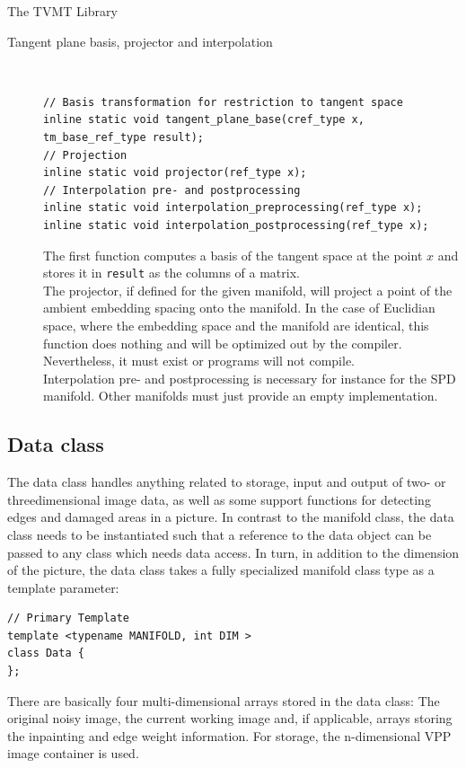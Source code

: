 \begin{chapter}{The TVMT Library}
\begin{description}
    \item[Tangent plane basis, projector and interpolation] \hfill \\
	\cppinline
	\begin{lstlisting}
// Basis transformation for restriction to tangent space
inline static void tangent_plane_base(cref_type x, tm_base_ref_type result);
// Projection
inline static void projector(ref_type x);
// Interpolation pre- and postprocessing
inline static void interpolation_preprocessing(ref_type x);
inline static void interpolation_postprocessing(ref_type x);
	\end{lstlisting}

	The first function computes a basis of the tangent space at the point $x$ and stores it in \texttt{result} as the columns of a matrix.\\
	The projector, if defined for the given manifold, will project a point of the ambient embedding spacing onto the manifold. In the case of Euclidian space, where the 
	embedding space and the manifold are identical, this function does nothing and will be optimized out by the compiler. Nevertheless, it must exist or programs will not compile.\\
	Interpolation pre- and postprocessing is necessary for instance for the SPD manifold. Other manifolds must just provide an empty implementation.
\end{description}
\subsection{Data class} %
\label{sub:Data class}
The data class handles anything related to storage, input and output of two- or threedimensional image data, as well as some support functions for detecting edges and damaged areas in a picture.
In contrast to the manifold class, the data class needs to be instantiated such that a reference to the data object can be passed to any class which needs data access. In turn, in addition
to the dimension of the picture, the data class takes a fully specialized manifold class type as a template parameter:

\cppinline
\begin{lstlisting}
// Primary Template
template <typename MANIFOLD, int DIM >
class Data {
};    
\end{lstlisting}

There are basically four multi-dimensional arrays stored in the data class: The original noisy image, the current working image and, if applicable, arrays storing the inpainting
and edge weight information. For storage, the n-dimensional VPP \cite{VPP} image container is used.\\


\end{chapter}

